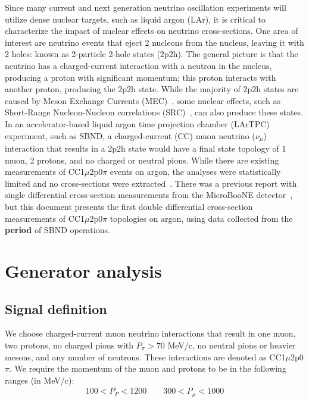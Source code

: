 \documentclass{article}
\begin{document}
Since many current and next generation neutrino oscillation experiments will utilize dense nuclear targets,
such as liquid argon (LAr), it is critical to characterize the impact of nuclear effects on neutrino cross-sections.
One area of interest are neutrino events that eject 2 nucleons from the nucleus, leaving it with 2 holes: known
as 2-particle 2-hole states (2p2h). The general picture is that the neutrino has a charged-current interaction
with a neutron in the nucleus, producing a proton with significant momentum; this proton interacts with
another proton, producing the 2p2h state. While the majority of 2p2h states are caused by Meson Exchange
Currents (MEC)~\cite{10.1063/1.4919465}, some nuclear effects, such as Short-Range Nucleon-Nucleon correlations (SRC)~\cite{Cruz-Torres:2019fum},
can also produce these states. In an accelerator-based liquid argon time projection chamber (LArTPC)
experiment, such as SBND, a charged-current (CC) muon neutrino ($\nu_\mu$) interaction that results in
a 2p2h state would have a final state topology of 1 muon, 2 protons, and no charged or neutral pions.
While there are existing measurements of CC1$\mu$2p0$\pi$ events on argon, the analyses were statistically limited
and no cross-sections were extracted~\cite{PhysRevD.90.012008,MicroBooNE:2018zvh}. There was a previous report with single differential cross-section
measurements from the MicroBooNE detector~\cite{MicroBooNE:2022pvp}, but this document presents the first double differential cross-section 
measurements of CC1$\mu$2p0$\pi$ topologies on argon, using data collected from the \textbf{period} of SBND operations.

\section{Generator analysis}

\subsection{Signal definition}

We choose charged-current muon neutrino interactions that result in one muon, two protons, no charged pions with $P_{\pi} > 70$ MeV/c, no neutral pions or heavier mesons, and any number of neutrons. These interactions are denoted as CC1$\mu$2p0$\pi$. We require the momentum of the muon and protons to be in the following ranges (in MeV/c):
\begin{align}
    100 < P_P < 1200 \qquad 300 < P_\mu < 1000
\end{align}
\end{document}
